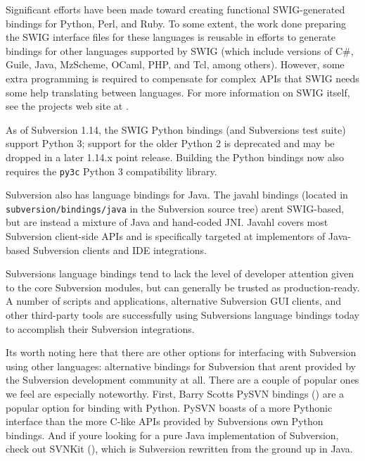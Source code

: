 Significant efforts have been made toward creating functional
SWIG-generated bindings for Python, Perl, and Ruby. To some extent, the
work done preparing the SWIG interface files for these languages is
reusable in efforts to generate bindings for other languages supported
by SWIG (which include versions of C\#, Guile, Java, MzScheme, OCaml,
PHP, and Tcl, among others). However, some extra programming is required
to compensate for complex APIs that SWIG needs some help translating
between languages. For more information on SWIG itself, see the
project\textquotesingle s web site at \href{https://www.swig.org/}{}.

As of Subversion 1.14, the SWIG Python bindings (and
Subversion\textquotesingle s test suite) support Python 3; support for
the older Python 2 is deprecated and may be dropped in a later 1.14.x
point release. Building the Python bindings now also requires the
\texttt{py3c} Python 3 compatibility library.

Subversion also has language bindings for Java. The javahl bindings
(located in \texttt{subversion/bindings/java} in the Subversion source
tree) aren\textquotesingle t SWIG-based, but are instead a mixture of
Java and hand-coded JNI. Javahl covers most Subversion client-side APIs
and is specifically targeted at implementors of Java-based Subversion
clients and IDE integrations.

Subversion\textquotesingle s language bindings tend to lack the level of
developer attention given to the core Subversion modules, but can
generally be trusted as production-ready. A number of scripts and
applications, alternative Subversion GUI clients, and other third-party
tools are successfully using Subversion\textquotesingle s language
bindings today to accomplish their Subversion integrations.

It\textquotesingle s worth noting here that there are other options for
interfacing with Subversion using other languages: alternative bindings
for Subversion that aren\textquotesingle t provided by the Subversion
development community at all. There are a couple of popular ones we feel
are especially noteworthy. First, Barry Scott\textquotesingle s PySVN
bindings (\href{https://pysvn.sourceforge.io/}{}) are a popular option
for binding with Python. PySVN boasts of a more Pythonic interface than
the more C-like APIs provided by Subversion\textquotesingle s own Python
bindings. And if you\textquotesingle re looking for a pure Java
implementation of Subversion, check out SVNKit
(\href{https://svnkit.com/}{}), which is Subversion rewritten from the
ground up in Java.

